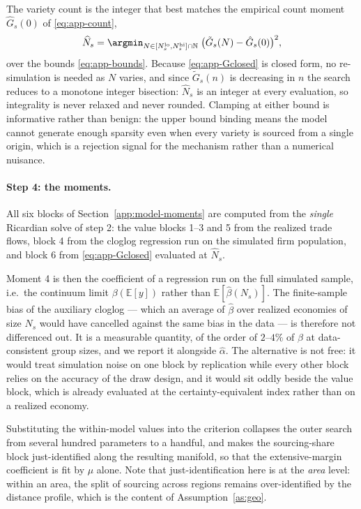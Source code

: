 The variety count is the integer that best matches the empirical count moment
$\hat G_{s}(0)$ of \eqref{eq:app-count},
\begin{equation}
\widehat N_{s}=\argmin_{N\in[N^{\mathrm{lo}}_{s},N^{\mathrm{hi}}_{s}]\cap\mathbb{N}}
\;\big(\tilde G_{s}(N)-\hat G_{s}(0)\big)^{2},
\label{eq:app-profile}
\end{equation}
over the bounds \eqref{eq:app-bounds}. Because \eqref{eq:app-Gclosed} is closed form, no
re-simulation is needed as $N$ varies, and since $\tilde G_{s}(n)$ is decreasing in $n$ the
search reduces to a monotone integer bisection: $\widehat N_{s}$ is an integer at every
evaluation, so integrality is never relaxed and never rounded. Clamping at either bound is
informative rather than benign: the upper bound binding means the model cannot generate enough
sparsity even when every variety is sourced from a single origin, which is a rejection signal for
the mechanism rather than a numerical nuisance.

\paragraph{Step 4: the moments.} All six blocks of Section~\ref{app:model-moments} are computed
from the \emph{single} Ricardian solve of step 2: the value blocks 1--3 and 5 from the realized
trade flows, block 4 from the cloglog regression run on the simulated firm population, and block
6 from \eqref{eq:app-Gclosed} evaluated at $\widehat N_{s}$.

\begin{remark}
\label{rem:binding}
Moment 4 is then the coefficient of a regression run on the full simulated sample, i.e.\ the
continuum limit $\beta(\mathbb{E}[y])$ rather than $\mathbb{E}[\hat\beta(N_{s})]$. The
finite-sample bias of the auxiliary cloglog --- which an average of $\hat\beta$ over realized
economies of size $N_{s}$ would have cancelled against the same bias in the data --- is therefore
not differenced out. It is a measurable quantity, of the order of $2$--$4\%$ of $\beta$ at
data-consistent group sizes, and we report it alongside $\hat\alpha$. The alternative is not
free: it would treat simulation noise on one block by replication while every other block relies
on the accuracy of the draw design, and it would sit oddly beside the value block, which is
already evaluated at the certainty-equivalent index rather than on a realized economy.
\end{remark}

Substituting the within-model values into the criterion collapses the outer search from several
hundred parameters to a handful, and makes the sourcing-share block just-identified along the
resulting manifold, so that the extensive-margin coefficient is fit by $\mu$ alone. Note that
just-identification here is at the \emph{area} level: within an area, the split of sourcing
across regions remains over-identified by the distance profile, which is the content of
Assumption~\ref{as:geo}.

